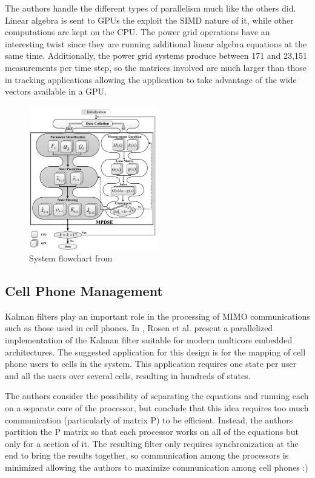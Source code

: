 \documentclass[11pt]{article}
\begin{document}
The authors handle the different types of parallelism much like the others did. Linear algebra is sent to GPUs the exploit the SIMD nature of it, while other computations are kept on the CPU. The power grid operations have an interesting twist since they are running additional linear algebra equations at the same time. Additionally, the power grid systems produce between 171 and 23,151 measurements per time step, so the matrices involved are much larger than those in tracking applications allowing the application to take advantage of the wide vectors available in a GPU.


\begin{figure}
\centering
\includegraphics[width=0.5\textwidth]{mpdse.png}
\caption{System flowchart from \cite{karimipour2015extended}}
\label{fig:mpdse}
\end{figure}

\subsection{Cell Phone Management}
Kalman filters play an important role in the processing of MIMO communications such as those used in cell phones. In \cite{rosen2013parallelization}, Rosen et al. present a parallelized implementation of the Kalman filter suitable for modern multicore embedded architectures. The suggested application for this design is for the mapping of cell phone users to cells in the system. This application requires one state per user and all the users over several cells, resulting in hundreds of states.

The authors consider the possibility of separating the equations and running each on a separate core of the processor, but conclude that this idea requires too much communication (particularly of matrix P) to be efficient. Instead, the authors partition the P matrix so that each processor works on all of the equations but only for a section of it. The resulting filter only requires synchronization at the end to bring the results together, so communication among the processors is minimized allowing the authors to maximize communication among cell phones :)
\end{document}
